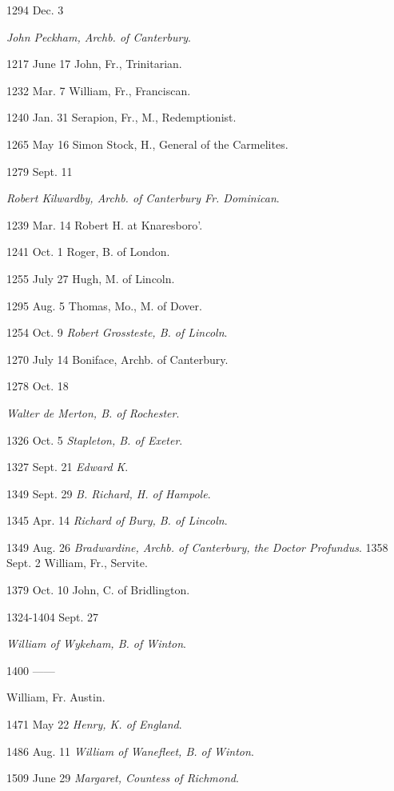1294 Dec. 3

\emph{John Peckham, Archb. of Canterbury}.


1217 June
17
John,
Fr., Trinitarian.

1232 Mar.
7
William, Fr., Franciscan.

1240 Jan.
31
Serapion, Fr., M., Redemptionist.

1265 May
16
Simon Stock, H., General of the Carmelites.

1279 Sept.
11

\emph{Robert Kilwardby, Archb. of Canterbury Fr. Dominican}.


1239 Mar.
14
Robert
H. at Knaresboro'.

1241 Oct.
1
Roger, B. of London.

1255 July
27
Hugh, M. of Lincoln.

1295 Aug.
5
Thomas, Mo., M. of Dover.

1254 Oct.
9
\emph{Robert Grossteste, B. of Lincoln}.

1270 July
14
Boniface, Archb. of Canterbury.

1278 Oct.
18

\emph{Walter de Merton, B. of Rochester}.


1326 Oct.
5
\emph{Stapleton,
B. of Exeter}.

1327 Sept.
21
\emph{Edward K}.

1349 Sept.
29
\emph{B. Richard, H. of Hampole}.

1345 Apr.
14
\emph{Richard of Bury, B. of Lincoln}.

1349 Aug.
26
\emph{Bradwardine, Archb. of Canterbury, the Doctor Profundus}.
1358 Sept.
2
William, Fr., Servite.

1379 Oct.
10
John, C. of Bridlington.

1324-1404 Sept.
27

\emph{William
of Wykeham, B. of Winton}.

1400 ——

William,
Fr. Austin.


1471 May
22
\emph{Henry,
K. of England}.

1486 Aug.
11
\emph{William of Wanefleet, B. of Winton}.

1509 June
29
\emph{Margaret, Countess of Richmond}.

